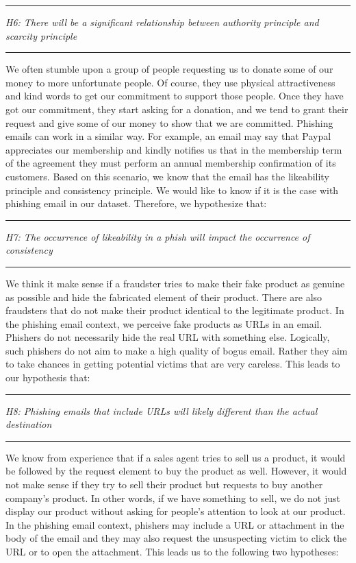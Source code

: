 \rule[0.5ex]{1\columnwidth}{1pt}

\textit{H6: There will be a significant relationship between authority
principle and scarcity principle}

\rule[0.5ex]{1\columnwidth}{1pt}

We often stumble upon a group of people requesting us to donate some
of our money to more unfortunate people. Of course, they use physical
attractiveness and kind words to get our commitment to support those
people. Once they have got our commitment, they start asking for a
donation, and we tend to grant their request and give some of our
money to show that we are committed. Phishing emails can work in a
similar way. For example, an email may say that Paypal appreciates
our membership and kindly notifies us that in the membership term
of the agreement they must perform an annual membership confirmation
of its customers. Based on this scenario, we know that the email has
the likeability principle and consistency principle. We would like
to know if it is the case with phishing email in our dataset. Therefore,
we hypothesize that:

\rule[0.5ex]{1\columnwidth}{1pt}

\textit{H7: The occurrence of likeability in a phish will impact the
occurrence of consistency}

\rule[0.5ex]{1\columnwidth}{1pt}

We think it make sense if a fraudster tries to make their fake product
as genuine as possible and hide the fabricated element of their product.
There are also fraudsters that do not make their product identical
to the legitimate product. In the phishing email context, we perceive
fake products as URLs in an email. Phishers do not necessarily hide
the real URL with something else. Logically, such phishers do not
aim to make a high quality of bogus email. Rather they aim to take
chances in getting potential victims that are very careless. This
leads to our hypothesis that:

\rule[0.5ex]{1\columnwidth}{1pt}

\textit{H8: Phishing emails that include URLs will likely different
than the actual destination}

\rule[0.5ex]{1\columnwidth}{1pt}

We know from experience that if a sales agent tries to sell us a product,
it would be followed by the request element to buy the product as
well. However, it would not make sense if they try to sell their product
but requests to buy another company's product. In other words, if
we have something to sell, we do not just display our product without
asking for people's attention to look at our product. In the phishing
email context, phishers may include a URL or attachment in the body
of the email and they may also request the unsuspecting victim to
click the URL or to open the attachment. This leads us to the following
two hypotheses:

